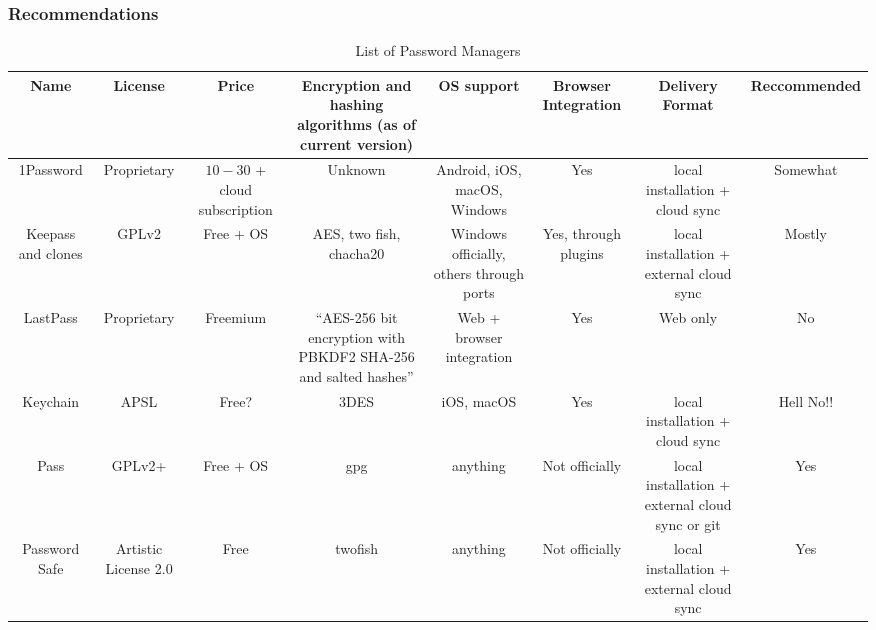 \documentclass{beamer}
\begin{document}
\begin{frame}
  \frametitle{Recommendations}
  \begin{table}[]
    \centering
    \caption{List of Password Managers}
    \begin{tabular}{@{}cccccccc@{}}
      \toprule
      \textbf{Name}      & \textbf{License}     & \textbf{Price}               & \textbf{Encryption and hashing algorithms (as of current version)} & \textbf{OS support}                      & \textbf{Browser Integration} & \textbf{Delivery Format}                        & \textbf{Reccommended}                                 \\ \midrule
      1Password          & Proprietary          & $10-$30 + cloud subscription & Unknown                                                            & Android, iOS, macOS, Windows             & Yes                          & local installation + cloud sync                 & Somewhat                                              \\
      Keepass and clones & GPLv2                & Free + OS                    & AES, two fish, chacha20                                            & Windows officially, others through ports & Yes, through plugins         & local installation + external cloud sync        & Mostly                                                \\
      LastPass           & Proprietary          & Freemium                     & ``AES-256 bit encryption with PBKDF2 SHA-256 and salted hashes''   & Web + browser integration                & Yes                          & Web only                                        & No                                                    \\
      Keychain           & APSL                 & Free?                        & 3DES                                                               & iOS, macOS                               & Yes                          & local installation + cloud sync                 & Hell No!!                                             \\
      Pass               & GPLv2+               & Free + OS                    & gpg                                                                & anything                                 & Not officially               & local installation + external cloud sync or git & Yes                                                   \\
      Password Safe      & Artistic License 2.0 & Free                         & twofish                                                            & anything                                 & Not officially               & local installation + external cloud sync        & Yes                                                   \\

\end{tabular}
\end{table}
\end{frame}
\end{document}

